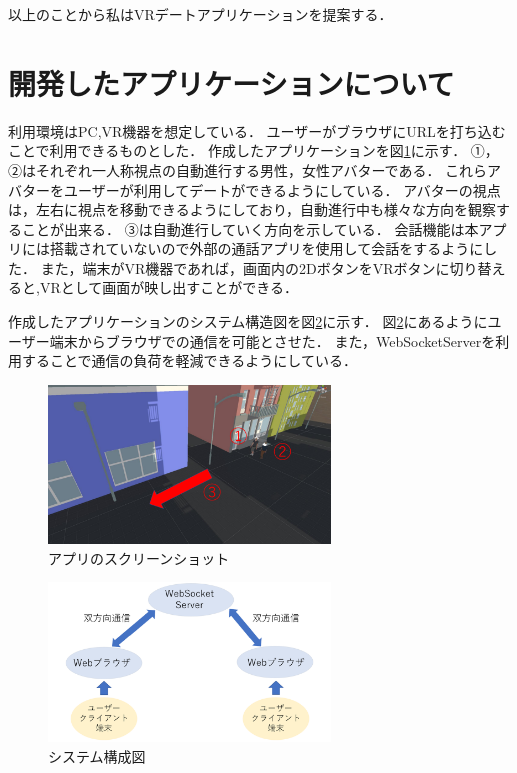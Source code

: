 \documentclass[twocolumn,10pt,a4j]{ltjsarticle}
\begin{document}
以上のことから私はVRデートアプリケーションを提案する．


\section{開発したアプリケーションについて}
利用環境はPC,VR機器を想定している．
ユーザーがブラウザにURLを打ち込むことで利用できるものとした．
作成したアプリケーションを図\ref{fig:screen}に示す．
①，②はそれぞれ一人称視点の自動進行する男性，女性アバターである．
これらアバターをユーザーが利用してデートができるようにしている．
アバターの視点は，左右に視点を移動できるようにしており，自動進行中も様々な方向を観察することが出来る．
③は自動進行していく方向を示している．
会話機能は本アプリには搭載されていないので外部の通話アプリを使用して会話をするようにした．
また，端末がVR機器であれば，画面内の2DボタンをVRボタンに切り替えると,VRとして画面が映し出すことができる．

作成したアプリケーションのシステム構造図を図\ref{fig:system}に示す．
図\ref{fig:system}にあるようにユーザー端末からブラウザでの通信を可能とさせた．
また，WebSocketServerを利用することで通信の負荷を軽減できるようにしている．


\begin{figure}[h]
\begin{center}
\includegraphics[width=75mm]{screenshot.pdf}
\end{center}
 \caption{アプリのスクリーンショット}
 \label{fig:screen}
\end{figure}

\begin{figure}[h]
\begin{center}
\includegraphics[width=75mm]{systemkouzou.pdf}
\end{center}
 \caption{システム構成図}
 \label{fig:system}
\end{figure}
\end{document}
